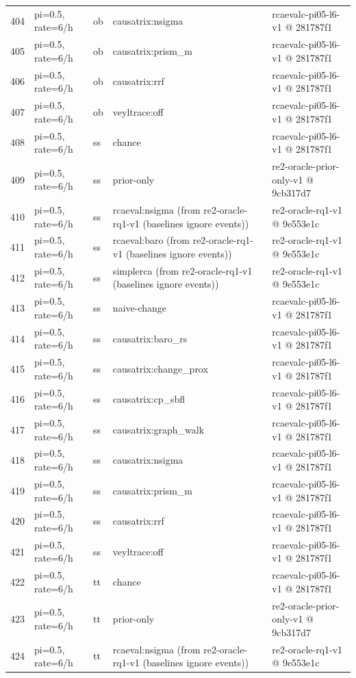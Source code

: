 \begin{longtable}{@{}r>{\raggedright\arraybackslash}p{48.0pt}>{\raggedright\arraybackslash}p{18.0pt}>{\raggedright\arraybackslash}p{108.0pt}>{\raggedright\arraybackslash}p{105.0pt}@{}}
404 & pi=0.5, rate=6/h & ob & causatrix:nsigma & rcaevalc-pi05-l6-v1 @ 281787f1 \\
405 & pi=0.5, rate=6/h & ob & causatrix:prism\_m & rcaevalc-pi05-l6-v1 @ 281787f1 \\
406 & pi=0.5, rate=6/h & ob & causatrix:rrf & rcaevalc-pi05-l6-v1 @ 281787f1 \\
407 & pi=0.5, rate=6/h & ob & veyltrace:off & rcaevalc-pi05-l6-v1 @ 281787f1 \\
408 & pi=0.5, rate=6/h & ss & chance & rcaevalc-pi05-l6-v1 @ 281787f1 \\
409 & pi=0.5, rate=6/h & ss & prior-only & re2-oracle-prior-only-v1 @ 9cb317d7 \\
410 & pi=0.5, rate=6/h & ss & rcaeval:nsigma (from re2-oracle-rq1-v1 (baselines ignore events)) & re2-oracle-rq1-v1 @ 9e553e1c \\
411 & pi=0.5, rate=6/h & ss & rcaeval:baro (from re2-oracle-rq1-v1 (baselines ignore events)) & re2-oracle-rq1-v1 @ 9e553e1c \\
412 & pi=0.5, rate=6/h & ss & simplerca (from re2-oracle-rq1-v1 (baselines ignore events)) & re2-oracle-rq1-v1 @ 9e553e1c \\
413 & pi=0.5, rate=6/h & ss & naive-change & rcaevalc-pi05-l6-v1 @ 281787f1 \\
414 & pi=0.5, rate=6/h & ss & causatrix:baro\_rs & rcaevalc-pi05-l6-v1 @ 281787f1 \\
415 & pi=0.5, rate=6/h & ss & causatrix:change\_prox & rcaevalc-pi05-l6-v1 @ 281787f1 \\
416 & pi=0.5, rate=6/h & ss & causatrix:cp\_sbfl & rcaevalc-pi05-l6-v1 @ 281787f1 \\
417 & pi=0.5, rate=6/h & ss & causatrix:graph\_walk & rcaevalc-pi05-l6-v1 @ 281787f1 \\
418 & pi=0.5, rate=6/h & ss & causatrix:nsigma & rcaevalc-pi05-l6-v1 @ 281787f1 \\
419 & pi=0.5, rate=6/h & ss & causatrix:prism\_m & rcaevalc-pi05-l6-v1 @ 281787f1 \\
420 & pi=0.5, rate=6/h & ss & causatrix:rrf & rcaevalc-pi05-l6-v1 @ 281787f1 \\
421 & pi=0.5, rate=6/h & ss & veyltrace:off & rcaevalc-pi05-l6-v1 @ 281787f1 \\
422 & pi=0.5, rate=6/h & tt & chance & rcaevalc-pi05-l6-v1 @ 281787f1 \\
423 & pi=0.5, rate=6/h & tt & prior-only & re2-oracle-prior-only-v1 @ 9cb317d7 \\
424 & pi=0.5, rate=6/h & tt & rcaeval:nsigma (from re2-oracle-rq1-v1 (baselines ignore events)) & re2-oracle-rq1-v1 @ 9e553e1c \\

\end{longtable}
